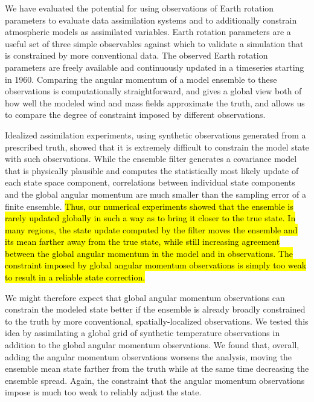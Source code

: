 
We have evaluated the potential for using observations of Earth rotation parameters to evaluate data assimilation systems and to additionally constrain atmospheric models as assimilated variables.  
%
Earth rotation parameters are a useful set of three simple observables against which to validate a simulation that is constrained by more conventional data.  
The observed Earth rotation parameters are freely available \citep{iers} and continuously updated in a timeseries starting in 1960. 
Comparing the angular momentum of a model ensemble to these observations is computationally straightforward, and 
gives a global view both of how well the modeled wind and mass fields approximate the truth, and allows us to compare the degree of constraint imposed by different observations. 

Idealized assimilation experiments, using synthetic observations generated from a prescribed truth, showed that it is extremely difficult to constrain the model state with such observations.  
While the ensemble filter generates a covariance model that is physically plausible and computes the statistically most likely update of each state space component, correlations between individual state components and the global angular momentum are much smaller than the sampling error of a finite ensemble. 
\hl{Thus, our numerical experiments showed that the ensemble is rarely updated globally in such a way as to bring it closer to the true state. 
In many regions, the state update computed by the filter moves the ensemble and its mean farther away from the true state, while still increasing agreement between the global angular momentum in the model and in observations. 
The constraint imposed by global angular momentum observations is simply too weak to result in a reliable state correction.} 

We might therefore expect that global angular momentum observations can constrain the modeled state better if the ensemble is already broadly constrained to the truth by more conventional, spatially-localized observations. 
We tested this idea by assimilating a global grid of synthetic temperature observations in addition to the global angular momentum observations. 
We found that, overall, adding the angular momentum observations worsens the analysis, moving the ensemble mean state farther from the truth while at the same time decreasing the ensemble spread.
Again, the constraint that the angular momentum observations impose is much too weak to reliably adjust the state.

